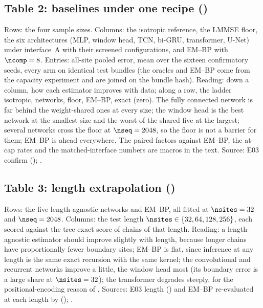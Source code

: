 \subsection{Table 2: baselines under one recipe ()}

Rows: the four sample sizes. Columns: the isotropic reference, the LMMSE floor, the six
architectures (MLP, window head, TCN, bi-GRU, transformer, U-Net) under interface~A with
their screened configurations, and EM--BP with $\ncomp=8$. Entries: all-site pooled error,
mean over the sixteen confirmatory seeds, every arm on identical test bundles (the
oracles and EM--BP come from the capacity experiment and are joined on the bundle hash).
Reading: down a column, how each estimator improves with data; along a row, the ladder
isotropic, networks, floor, EM--BP, exact (zero). The fully connected network is far
behind the weight-shared ones at every size; the window head is the best network at the
smallest size and the worst of the shared five at the largest; several networks cross
the floor at $\nseq=2048$, so the floor is not a barrier for them; EM--BP is ahead
everywhere. The paired factors against EM--BP, the at-cap rates and the matched-interface
numbers are macros in the text. Source: E03 confirm ();
.

\subsection{Table 3: length extrapolation ()}

Rows: the five length-agnostic networks and EM--BP, all fitted at $\nsites=32$ and
$\nseq=2048$. Columns: the test length $\nsites\in\{32,64,128,256\}$, each scored against
the tree-exact score of chains of that length. Reading: a length-agnostic estimator
should improve slightly with length, because longer chains have proportionally fewer
boundary sites; EM--BP is flat, since inference at any length is the same exact recursion
with the same kernel; the convolutional and recurrent networks improve a little, the
window head most (its boundary error is a large share at $\nsites=32$); the transformer
degrades steeply, for the positional-encoding reason of .
Sources: E03 length () and EM--BP re-evaluated at each
length by  ();
.

